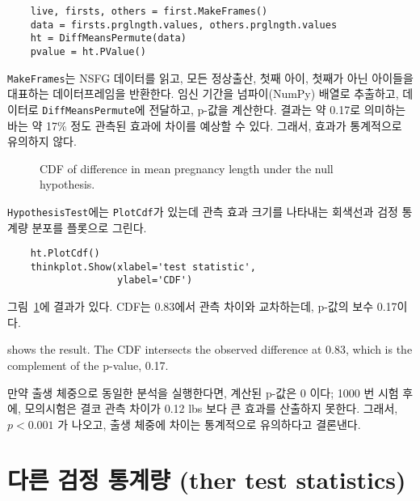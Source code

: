 \begin{verbatim}
    live, firsts, others = first.MakeFrames()
    data = firsts.prglngth.values, others.prglngth.values
    ht = DiffMeansPermute(data)
    pvalue = ht.PValue()
\end{verbatim}

{\tt MakeFrames}는 NSFG 데이터를 읽고, 모든 정상출산, 첫째 아이, 첫째가 아닌 아이들을 대표하는 데이터프레임을 반환한다.
임신 기간을 넘파이(NumPy) 배열로 추출하고, 데이터로 {\tt DiffMeansPermute}에 전달하고, p-값을 계산한다.
결과는 약 0.17로 의미하는 바는 약 17\% 정도 관측된 효과에 차이를 예상할 수 있다. 그래서, 효과가 통계적으로 유의하지 않다.


\begin{figure}
\caption{CDF of difference in mean pregnancy length under the null
hypothesis.}
\label{hypothesis1}
\end{figure}

{\tt HypothesisTest}에는 {\tt PlotCdf}가 있는데 관측 효과 크기를 나타내는 회색선과 검정 통계량 분포를 플롯으로 그린다.

\begin{verbatim}
    ht.PlotCdf()
    thinkplot.Show(xlabel='test statistic',
                   ylabel='CDF')
\end{verbatim}

그림~\ref{hypothesis1}에 결과가 있다.
CDF는 0.83에서 관측 차이와 교차하는데, p-값의 보수 0.17이다.

 shows the result.  The CDF intersects the
observed difference at 0.83, which is the complement of the p-value,
0.17.

만약 출생 체중으로 동일한 분석을 실행한다면, 계산된 p-값은 0 이다; 1000 번 시험 후에, 모의시험은 결코 관측 차이가 0.12 lbs 보다 큰 효과를 산출하지 못한다.
그래서, $p < 0.001$ 가 나오고, 출생 체중에 차이는 통계적으로 유의하다고 결론낸다. 



\section{다른 검정 통계량 (ther test statistics)}

